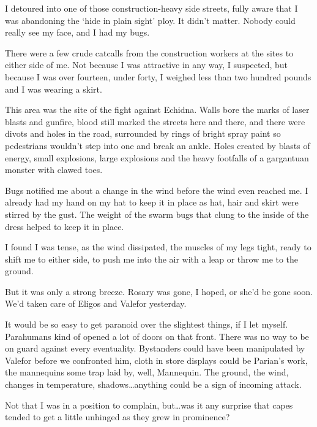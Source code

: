 I detoured into one of those construction-heavy side streets, fully aware that I was abandoning the `hide in plain sight' ploy.  It didn't matter.  Nobody could really see my face, and I had my bugs.



There were a few crude catcalls from the construction workers at the sites to either side of me.  Not because I was attractive in any way, I suspected, but because I was over fourteen, under forty, I weighed less than two hundred pounds and I was wearing a skirt.



This area was the site of the fight against Echidna.  Walls bore the marks of laser blasts and gunfire, blood still marked the streets here and there, and there were divots and holes in the road, surrounded by rings of bright spray paint so pedestrians wouldn't step into one and break an ankle.  Holes created by blasts of energy, small explosions, large explosions and the heavy footfalls of a gargantuan monster with clawed toes.



Bugs notified me about a change in the wind before the wind even reached me.  I already had my hand on my hat to keep it in place as hat, hair and skirt were stirred by the gust.  The weight of the swarm bugs that clung to the inside of the dress helped to keep it in place.



I found I was tense, as the wind dissipated, the muscles of my legs tight, ready to shift me to either side, to push me into the air with a leap or throw me to the ground.



But it was only a strong breeze.  Rosary was gone, I hoped, or she'd be gone soon.  We'd taken care of Eligos and Valefor yesterday.



It would be so easy to get paranoid over the slightest things, if I let myself.  Parahumans kind of opened a lot of doors on that front.  There was no way to be on guard against every eventuality.  Bystanders could have been manipulated by Valefor before we confronted him, cloth in store displays could be Parian's work, the mannequins some trap laid by, well, Mannequin.  The ground, the wind, changes in temperature, shadows\ldots anything could be a sign of incoming attack.



Not that I was in a position to complain, but\ldots was it any surprise that capes tended to get a little unhinged as they grew in prominence?



